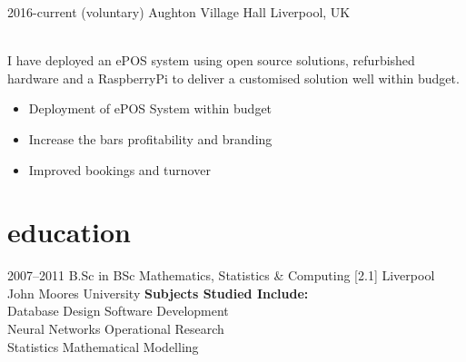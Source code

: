 \documentclass[]{cv-style}          %
\begin{document}
%
\begin{entrylist}
\entry
  {2016-current (voluntary)}
  {Aughton Village Hall}
  {Liverpool, UK}
  {\\{I have deployed an ePOS system using open source solutions, refurbished hardware and a RaspberryPi to deliver a customised solution well within budget.\\}
  \begin{itemize}
    \item Deployment of ePOS System within budget
    \item Increase the bars profitability and branding
    \item Improved bookings and turnover
  \end{itemize}
}
\end{entrylist}

\section{education}

\begin{entrylist}
  \entry
  {2007--2011}
  {B.Sc {\normalfont in BSc Mathematics, Statistics \& Computing [2.1]}}
  {Liverpool John Moores University}
  {
  \textbf{Subjects Studied Include:}\\
  {\quad Database Design \qquad Software Development\\}
  {\qquad Neural Networks \qquad Operational Research\\}
  {\qquad Statistics \qquad \qquad \quad Mathematical Modelling\\}
  }
\end{entrylist}
\end{document}
